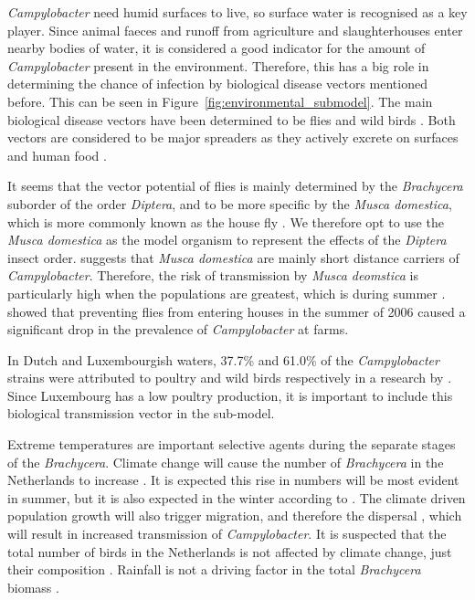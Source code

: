 \textit{Campylobacter} need humid surfaces to live, so surface water is recognised as a key player. Since animal faeces and runoff from agriculture and slaughterhouses enter nearby bodies of water, it is considered a good indicator for the amount of \textit{Campylobacter} present in the environment. Therefore, this has a big role in determining the chance of infection by biological disease vectors mentioned before. This can be seen in Figure~\ref{fig:environmental_submodel}. The main biological disease vectors have been determined to be flies and wild birds \parencite{mughini-gras_quantifying_2016}. Both vectors are considered to be major spreaders as they actively excrete  on surfaces and human food \parencite{french_molecular_2009, hald_influxed_2008, berndtson_campylobacter_1996}.

It seems that the vector potential of flies is mainly determined by the \textit{Brachycera} suborder of the order \textit{Diptera}, and to be more specific by the \textit{Musca domestica}, which is more commonly known as the house fly \parencite{hald_influxed_2008}. We therefore opt to use the \textit{Musca domestica} as the model organism to represent the effects of the \textit{Diptera} insect order. \cite{skovgard_retention_2011} suggests that \textit{Musca domestica} are mainly short distance carriers of \textit{Campylobacter}. Therefore, the risk of transmission by \textit{Musca deomstica} is particularly high when the populations are greatest, which is during summer \parencite{royden_role_2016}. \cite{hald_use_2007} showed that preventing flies from entering houses in the summer of 2006 caused a significant drop in the prevalence of \textit{Campylobacter} at farms.

In Dutch and Luxembourgish waters, 37.7\% and 61.0\% of the \textit{Campylobacter} strains were attributed to poultry and wild birds respectively in a research by \cite{mughini-gras_quantifying_2016}. Since Luxembourg has a low poultry production, it is important to include this biological transmission vector in the sub-model.

Extreme temperatures are important selective agents during the separate stages of the \textit{Brachycera}. Climate change will cause the number of \textit{Brachycera} in the Netherlands to increase \parencite{goulson_predicting_2005}. It is expected this rise in numbers will be most evident in summer, but it is also expected in the winter according to \citeauthor{goulson_predicting_2005}. The climate driven population growth will also trigger migration, and therefore the dispersal \parencite{feder_locomotion_2010}, which will result in increased transmission of \textit{Campylobacter}. It is suspected that the total number of birds in the Netherlands is not affected by climate change, just their composition \parencite{mclean_reduced_2020, knudsen_challenging_2011}. Rainfall is not a driving factor in the total \textit{Brachycera} biomass \parencite{goulson_predicting_2005}.

